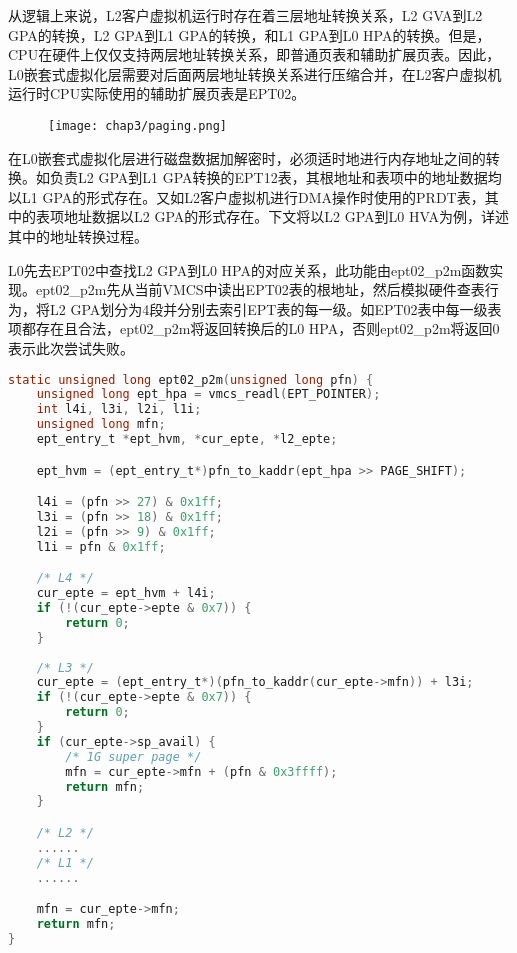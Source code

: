 从逻辑上来说，L2客户虚拟机运行时存在着三层地址转换关系，L2 GVA到L2 GPA的转换，L2 GPA到L1 GPA的转换，和L1 GPA到L0 HPA的转换。但是，CPU在硬件上仅仅支持两层地址转换关系，即普通页表和辅助扩展页表。因此，L0嵌套式虚拟化层需要对后面两层地址转换关系进行压缩合并，在L2客户虚拟机运行时CPU实际使用的辅助扩展页表是EPT02。

\begin{figure}[!htbp]
  \centering
  \texttt{[image: chap3/paging.png]}
\end{figure}

在L0嵌套式虚拟化层进行磁盘数据加解密时，必须适时地进行内存地址之间的转换。如负责L2 GPA到L1 GPA转换的EPT12表，其根地址和表项中的地址数据均以L1 GPA的形式存在。又如L2客户虚拟机进行DMA操作时使用的PRDT表，其中的表项地址数据以L2 GPA的形式存在。下文将以L2 GPA到L0 HVA为例，详述其中的地址转换过程。

L0先去EPT02中查找L2 GPA到L0 HPA的对应关系，此功能由ept02\_p2m函数实现。ept02\_p2m先从当前VMCS中读出EPT02表的根地址，然后模拟硬件查表行为，将L2 GPA划分为4段并分别去索引EPT表的每一级。如EPT02表中每一级表项都存在且合法，ept02\_p2m将返回转换后的L0 HPA，否则ept02\_p2m将返回0表示此次尝试失败。

\begin{lstlisting}[language={C}, caption={ept02\_p2m实现源代码}]
static unsigned long ept02_p2m(unsigned long pfn) {
    unsigned long ept_hpa = vmcs_readl(EPT_POINTER);
    int l4i, l3i, l2i, l1i;
    unsigned long mfn;
    ept_entry_t *ept_hvm, *cur_epte, *l2_epte;

    ept_hvm = (ept_entry_t*)pfn_to_kaddr(ept_hpa >> PAGE_SHIFT);

    l4i = (pfn >> 27) & 0x1ff;
    l3i = (pfn >> 18) & 0x1ff;
    l2i = (pfn >> 9) & 0x1ff;
    l1i = pfn & 0x1ff;

    /* L4 */
    cur_epte = ept_hvm + l4i;
    if (!(cur_epte->epte & 0x7)) {
        return 0;
    }
    
    /* L3 */
    cur_epte = (ept_entry_t*)(pfn_to_kaddr(cur_epte->mfn)) + l3i;
    if (!(cur_epte->epte & 0x7)) {
        return 0;
    }
    if (cur_epte->sp_avail) {
    	/* 1G super page */
        mfn = cur_epte->mfn + (pfn & 0x3ffff);
        return mfn;
    }

    /* L2 */
    ......
    /* L1 */
    ......

    mfn = cur_epte->mfn;
    return mfn;
}
\end{lstlisting}

